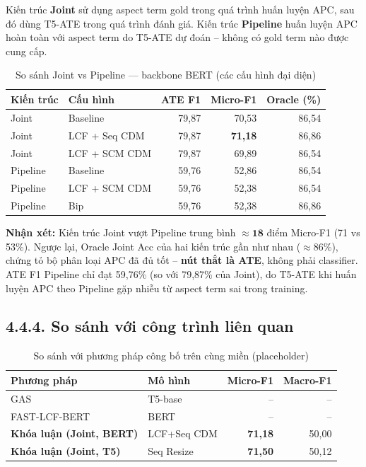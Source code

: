 Kiến trúc \textbf{Joint} sử dụng aspect term gold trong quá trình huấn
luyện APC, sau đó dùng T5-ATE trong quá trình đánh giá.
Kiến trúc \textbf{Pipeline} huấn luyện APC hoàn toàn với aspect term
do T5-ATE dự đoán -- không có gold term nào được cung cấp.

\begin{table}[H]
\centering
\small
\caption{So sánh Joint vs Pipeline — backbone BERT (các cấu hình đại diện)}
\label{tab:joint_vs_pipeline}
\begin{tabular}{@{}llrrr@{}}
\toprule
\textbf{Kiến trúc} & \textbf{Cấu hình} & \textbf{ATE F1} & \textbf{Micro-F1} & \textbf{Oracle (\%)} \\
\midrule
Joint    & Baseline          & 79,87 & 70,53 & 86,54 \\
Joint    & LCF + Seq CDM     & 79,87 & \textbf{71,18} & 86,86 \\
Joint    & LCF + SCM CDM    & 79,87 & 69,89 & 86,54 \\
\midrule
Pipeline & Baseline          & 59,76 & 52,86 & 86,54 \\
Pipeline & LCF + SCM CDM    & 59,76 & 52,38 & 86,54 \\
Pipeline & Bip               & 59,76 & 52,38 & 86,86 \\
\bottomrule
\end{tabular}
\end{table}

\textbf{Nhận xét:} Kiến trúc Joint vượt Pipeline trung bình
$\approx\mathbf{18}$ điểm Micro-F1 (71 vs 53\%). Ngược lại,
Oracle Joint Acc của hai kiến trúc gần như nhau ($\approx86\%$),
chứng tỏ bộ phân loại APC đã đủ tốt -- \textbf{nút thắt là ATE},
không phải classifier. ATE F1 Pipeline chỉ đạt 59,76\% (so với 79,87\%
của Joint), do T5-ATE khi huấn luyện APC theo Pipeline gặp nhiễu
từ aspect term sai trong training.

\subsection{4.4.4.\; So sánh với công trình liên quan}
\label{subsec:paper_comparison}

\begin{table}[H]
\centering
\small
\caption{So sánh với phương pháp công bố trên cùng miền (placeholder)}
\label{tab:paper_comparison}
\begin{tabular}{@{}llrr@{}}
\toprule
\textbf{Phương pháp} & \textbf{Mô hình} & \textbf{Micro-F1} & \textbf{Macro-F1} \\
\midrule
GAS \cite{zhang2021gas}                 & T5-base  & -- & -- \\
FAST-LCF-BERT \cite{zeng2019lcf}        & BERT     & -- & -- \\
\midrule
\textbf{Khóa luận (Joint, BERT)}  & LCF+Seq CDM   & \textbf{71,18} & 50,00 \\
\textbf{Khóa luận (Joint, T5)}    & Seq Resize    & \textbf{71,50} & 50,12 \\
\bottomrule
\end{tabular}
\end{table}

